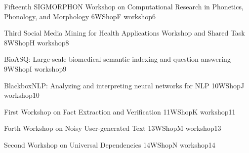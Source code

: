       \begin{wsschedule}
      {Fifteenth SIGMORPHON Workshop on Computational Research in Phonetics, Phonology, and Morphology}
      {6}{WShopF}
      {workshop6}
      {\WShopLocF}
      
      \end{wsschedule}
      

%      
      

      \begin{wsschedule}
      {Third Social Media Mining for Health Applications Workshop and Shared Task}
      {8}{WShopH}
      {workshop8}
      {\WShopLocH}
      
      \end{wsschedule}




 \begin{wsschedule}
      {BioASQ: Large-scale biomedical semantic indexing and question answering}
      {9}{WShopI}
      {workshop9}
      {\WShopLocI}
      
      \end{wsschedule}
      

      \begin{wsschedule}
      {BlackboxNLP: Analyzing and interpreting neural networks for NLP}
      {10}{WShopJ}
      {workshop10}
      {\WShopLocJ}
      
      \end{wsschedule}
      

      \begin{wsschedule}
      {First Workshop on Fact Extraction and Verification}
      {11}{WShopK}
      {workshop11}
      {\WShopLocK}
      
      \end{wsschedule}
      

%      
      

      \begin{wsschedule}
      {Forth Workshop on Noisy User-generated Text}
      {13}{WShopM}
      {workshop13}
      {\WShopLocM}
      
      \end{wsschedule}
      

      \begin{wsschedule}
      {Second Workshop on Universal Dependencies}
      {14}{WShopN}
      {workshop14}
      {\WShopLocN}
      
      \end{wsschedule}

\clearpage{\thispagestyle{emptyheader}\cleardoublepage}
